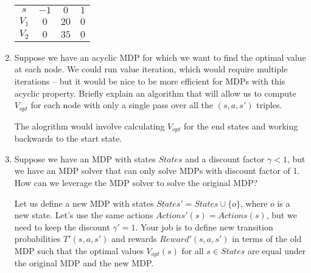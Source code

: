 \documentclass[10pt]{article}
\begin{document}
\begin{enumerate}[label=(\alph*)]
\begin{center}
	\end{center}
	
	\begin{tabular}{c | c c c}
		$s$ & $-1$ & $0$ & $1$\\
  		$V_1$ & $0$ & $20$ & $0$\\
  		$V_2$ & $0$ & $35$ & $0$\\
  	\end{tabular}
  
  \item Suppose we have an acyclic MDP for which we want to find the optimal value at each node. We could run value iteration, which would require multiple iterations -- but it would be nice to be more efficient for MDPs with this acyclic property. Briefly explain an algorithm that will allow us to compute $V_{opt}$ for each node with only a single pass over all the $(s,a,s')$ triples.
  
  The alogrithm would involve calculating $V_{opt}$ for the end states and working backwards to the start state.
  
  \item Suppose we have an MDP with states $States$ and a discount factor $\gamma < 1$, but we have an MDP solver that can only solve MDPs with discount factor of 1. How can we leverage the MDP solver to solve the original MDP?
  
  Let us define a new MDP with states $States'= States \cup \{o\}$, where $o$ is a new state. Let's use the same actions $Actions'(s) = Actions(s)$, but we need to keep the discount $\gamma' = 1$. Your job is to define new transition probabilities $T'(s,a,s')$ and rewards $Reward'(s,a,s')$ in terms of the old MDP such that the optimal values $V_{opt}(s)$ for all $s \in States$ are equal under the original MDP and the new MDP.
  

\end{enumerate}
\end{document}
